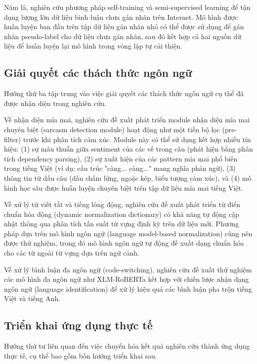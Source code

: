\documentclass[14pt, a4paper]{report}
\begin{document}
Năm là, nghiên cứu phương pháp self-training và semi-supervised learning để tận dụng lượng lớn dữ liệu bình luận chưa gán nhãn trên Internet. Mô hình được huấn luyện ban đầu trên tập dữ liệu gán nhãn nhỏ có thể được sử dụng để gán nhãn pseudo-label cho dữ liệu chưa gán nhãn, sau đó kết hợp cả hai nguồn dữ liệu để huấn luyện lại mô hình trong vòng lặp tự cải thiện.


\subsection{Giải quyết các thách thức ngôn ngữ}


Hướng thứ ba tập trung vào việc giải quyết các thách thức ngôn ngữ cụ thể đã được nhận diện trong nghiên cứu.


Về nhận diện mỉa mai, nghiên cứu đề xuất phát triển module nhận diện mỉa mai chuyên biệt (sarcasm detection module) hoạt động như một tiền bộ lọc (pre-filter) trước khi phân tích cảm xúc. Module này có thể sử dụng kết hợp nhiều tín hiệu: (1) sự mâu thuẫn giữa sentiment của các vế trong câu (phát hiện bằng phân tích dependency parsing), (2) sự xuất hiện của các pattern mỉa mai phổ biến trong tiếng Việt (ví dụ: cấu trúc "càng... càng..." mang nghĩa phản ngữ), (3) thông tin từ dấu câu (dấu chấm lửng, ngoặc kép, biểu tượng cảm xúc), và (4) mô hình học sâu được huấn luyện chuyên biệt trên tập dữ liệu mỉa mai tiếng Việt.


Về xử lý từ viết tắt và tiếng lóng động, nghiên cứu đề xuất phát triển từ điển chuẩn hóa động (dynamic normalization dictionary) có khả năng tự động cập nhật thông qua phân tích tần suất từ vựng định kỳ trên dữ liệu mới. Phương pháp dựa trên mô hình ngôn ngữ (language model-based normalization) cũng nên được thử nghiệm, trong đó mô hình ngôn ngữ tự động đề xuất dạng chuẩn hóa cho các từ ngoài từ vựng dựa trên ngữ cảnh.


Về xử lý bình luận đa ngôn ngữ (code-switching), nghiên cứu đề xuất thử nghiệm các mô hình đa ngôn ngữ như XLM-RoBERTa kết hợp với chiến lược nhận dạng ngôn ngữ (language identification) để xử lý hiệu quả các bình luận pha trộn tiếng Việt và tiếng Anh.


\subsection{Triển khai ứng dụng thực tế}


Hướng thứ tư liên quan đến việc chuyển hóa kết quả nghiên cứu thành ứng dụng thực tế, cụ thể bao gồm bốn hướng triển khai sau.
\end{document}
